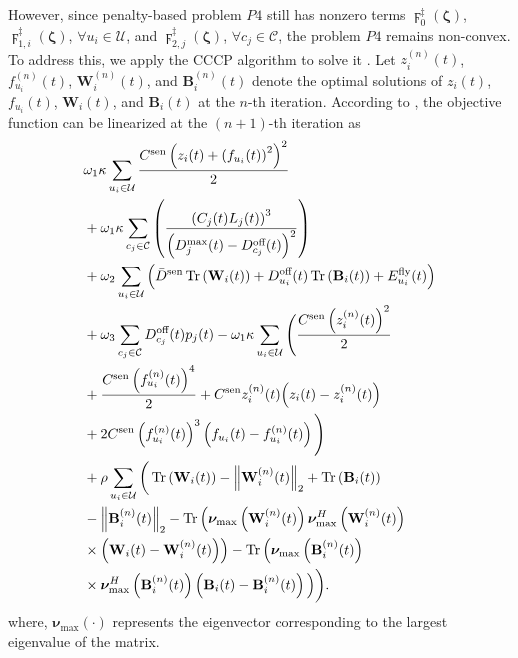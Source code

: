 \documentclass[10pt,journal,compsoc]{IEEEtran}
\begin{document}
However, since penalty-based problem $P4$ still has nonzero terms $\digamma_{0}^{\ddagger}\left(\bm{\zeta}\right)$, $\digamma_{1, i}^{\ddagger}\left(\bm{\zeta}\right)$, $\forall u_{i} \in \mathcal{U}$, and $\digamma_{2, j}^{\ddagger}\left(\bm{\zeta}\right)$, $\forall c_{j} \in \mathcal{C}$, the problem $P4$ remains non-convex. 
To address this, we apply the CCCP algorithm to solve it \cite{Solution: Rank-One-Penalty-1}.
Let $z^{(n)}_{i}(t)$, $f^{(n)}_{u_{i}}(t)$, $\mathbf{W}^{(n)}_{i}(t)$, and $\mathbf{B}^{(n)}_{i}(t)$ denote the optimal solutions of $z_{i}(t)$, $f_{u_{i}}(t)$, $\mathbf{W}_{i}(t)$, and $\mathbf{B}_{i}(t)$ at the $n$-th iteration. 
According to \cite{Solution: Rank-One-Penalty-1, Solution: Rank-One-Penalty-2}, the objective function can be linearized at the $(n + 1)$-th iteration as
\begin{align}\label{CCCP:Obj}
    & \omega_{1}\kappa \sum_{u_{i} \in \mathcal{U}}\frac{C^{\text{sen}} \left( z_{i}(t) + \left(f_{u_{i}}(t)\right)^{2}\right)^{2}}{2} \notag \\
    & + \omega_{1}\kappa \sum_{c_{j} \in \mathcal{C}}\left(\frac{\left(C_{{j}}(t)L_{j}(t)\right)^{3}}{\left(D^{\max}_{j}(t) - D_{c_{j}}^{\text{off}}(t)\right)^{2}}\right) \notag \\
    & + \omega_{2}\sum_{u_{i} \in \mathcal{U}} \Big(\bar{D}^{\text{sen}}\operatorname{Tr}\left(\mathbf{W}_{i}(t)\right) + D_{u_{i}}^{\text{off}}(t)\operatorname{Tr}\left(\mathbf{B}_{i}(t)\right) + E_{u_{i}}^{\text{fly}}(t)\Big) \notag \\
    & + \omega_{3}\sum_{c_{j} \in \mathcal{C}}D_{c_{j}}^{\text{off}}(t)p_{j}(t) - \omega_{1}\kappa \sum_{u_{i} \in \mathcal{U}}\Bigg( \frac{C^{\text{sen}}\left(z_{i}^{(n)}(t)\right)^{2}}{2} \notag \\
    & + \frac{C^{\text{sen}}\left(f_{u_{i}}^{(n)}(t)\right)^{4}}{2} + C^{\text{sen}}z_{i}^{(n)}(t)\Big(z_{i}(t) - z_{i}^{(n)}(t)\Big) \notag \\
    & + 2C^{\text{sen}}\left(f_{u_{i}}^{(n)}(t)\right)^{3}\left(f_{u_{i}}(t) - f_{u_{i}}^{(n)}(t)\right) \Bigg) \notag \\
    & + \rho \sum_{u_{i} \in \mathcal{U}} \bigg(\operatorname{Tr}\left(\mathbf{W}_{i}(t)\right) - \left\|\mathbf{W}^{(n)}_{i}(t)\right\|_{2} + \operatorname{Tr}\left(\mathbf{B}_{i}(t)\right) \notag \\
    & - \left\|\mathbf{B}^{(n)}_{i}(t)\right\|_{2} - \operatorname{Tr}\Big(\bm{\nu}_{\max}\left(\mathbf{W}^{(n)}_{i}(t)\right)\bm{\nu}^{H}_{\max}\left(\mathbf{W}^{(n)}_{i}(t)\right) \notag \\
    & \times \Big(\mathbf{W}_{i}(t) - \mathbf{W}^{(n)}_{i}(t)\Big)\Big) - \operatorname{Tr}\Big(\bm{\nu}_{\max}\left(\mathbf{B}^{(n)}_{i}(t)\right) \notag \\
    & \times \bm{\nu}^{H}_{\max} \left(\mathbf{B}^{(n)}_{i}(t)\right)\left(\mathbf{B}_{i}(t) - \mathbf{B}^{(n)}_{i}(t)\right)\Big)\bigg).
\end{align}
where, $\bm{\nu}_{\max}\left(\cdot\right)$ represents the eigenvector corresponding to the largest eigenvalue of the matrix.
\end{document}
